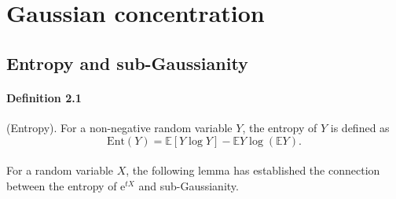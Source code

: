 \documentclass{article}
\newcommand{\E}{\mathbb{E}}
\begin{document}
\paragraph{}

\section{Gaussian concentration}
\subsection{Entropy and sub-Gaussianity} 
\paragraph{Definition 2.1} (Entropy). For a non-negative random variable $Y$, the entropy of $Y$ is defined as
\begin{equation*}
	 \mathrm{Ent}(Y) = \E[Y\log Y] - \E Y\log(\E Y).\tag{2.1}
\end{equation*} 

\paragraph{} For a random variable $X$, the following lemma has established the connection between the entropy of $\mathrm{e}^{tX}$ and sub-Gaussianity.
\end{document}
